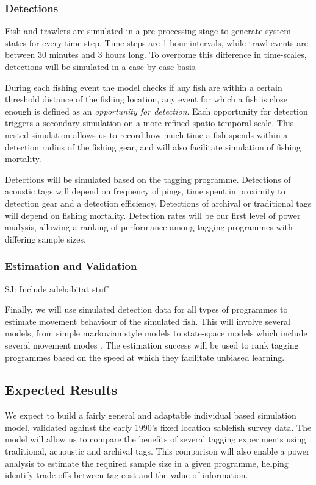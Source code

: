 \documentclass{article}
\newcommand{\sj}[1]{{\color{red}\mbox{}\marginpar{\raggedleft\hspace{0pt}*} SJ: #1}}
\begin{document}
\subsubsection*{Detections}

Fish and trawlers are simulated in a pre-processing stage to generate system states for every time step. Time steps are 1 hour intervals, while trawl events are between 30 minutes and 3 hours long. To overcome this difference in time-scales, detections will be simulated in a case by case basis.

During each fishing event the model checks if any fish are within a certain threshold distance of the fishing location, any event for which a fish is close enough is defined as an {\it opportunity for detection}. Each opportunity for detection triggers a secondary simulation on a more refined spatio-temporal scale. This nested simulation allows us to record how much time a fish spends within a detection radius of the fishing gear, and will also facilitate simulation of fishing mortality. 

Detections will be simulated based on the tagging programme. Detections of acoustic tags will depend on frequency of pings, time spent in proximity to detection gear and a detection efficiency. Detections of archival or traditional tags will depend on fishing mortality. Detection rates will be our first level of power analysis, allowing a ranking of performance among tagging programmes with differing sample sizes.

\subsubsection*{Estimation and Validation}

\sj{Include adehabitat stuff}

Finally, we will use simulated detection data for all types of programmes to estimate movement behaviour of the simulated fish. This will involve several models, from simple markovian style models \citep{mcgarvey2002estimating} to state-space models which include several movement modes \citep{fryxell2008multiple}. The estimation success will be used to rank tagging programmes based on the speed at which they facilitate unbiased learning.


\subsection{Expected Results}

We expect to build a fairly general and adaptable individual based simulation model, validated against the early 1990's fixed location sablefish survey data. The model will allow us to compare the benefits of several tagging experiments using traditional, acuoustic and archival tags. This comparison will also enable a power analysis to estimate the required sample size in a given programme, helping identify trade-offs between tag cost and the value of information.
\end{document}

